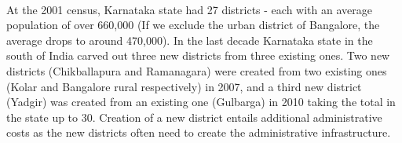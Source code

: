 \documentclass[12pt, a4paper]{article}
\begin{document}
\paragraph{} At the 2001 census, Karnataka state had 27 districts - each with an average population of over 660,000 (If we exclude the urban district of Bangalore, the average drops to around 470,000). In the last decade Karnataka state in the south of India carved out three new districts from three existing ones. Two new districts (Chikballapura and Ramanagara) were created from two existing ones (Kolar and Bangalore rural respectively) in 2007, and a third new district (Yadgir) was created from an existing one (Gulbarga) in 2010 taking the total in the state up to 30. Creation of a new district entails additional administrative costs as the new districts often need to create the administrative infrastructure.


\printbibliography
\pagebreak
\end{document}
